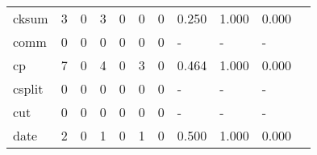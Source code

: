 \begin{longtable}{lp{1.2cm}p{1.2cm}p{1.2cm}p{1.2cm}p{1.2cm}p{1.2cm}p{1.2cm}p{1.2cm}p{1.2cm}p{1.2cm}}
cksum     &                                     3 &                                                  0 &                                                3 &                                               0 &                                                0 &                                              0 &                                         0.250 &                                              1.000 &                                              0.000 \\
comm      &                                     0 &                                                  0 &                                                0 &                                               0 &                                                0 &                                              0 &                                             - &                                                  - &                                                  - \\
cp        &                                     7 &                                                  0 &                                                4 &                                               0 &                                                3 &                                              0 &                                         0.464 &                                              1.000 &                                              0.000 \\
csplit    &                                     0 &                                                  0 &                                                0 &                                               0 &                                                0 &                                              0 &                                             - &                                                  - &                                                  - \\
cut       &                                     0 &                                                  0 &                                                0 &                                               0 &                                                0 &                                              0 &                                             - &                                                  - &                                                  - \\
date      &                                     2 &                                                  0 &                                                1 &                                               0 &                                                1 &                                              0 &                                         0.500 &                                              1.000 &                                              0.000 \\

\end{longtable}

